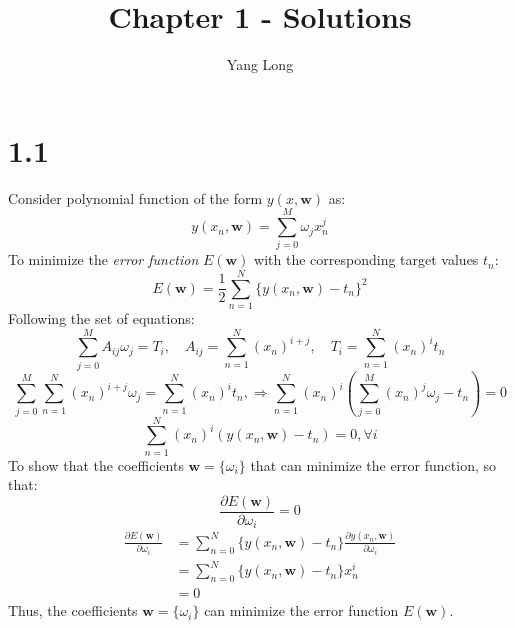 \documentclass[10pt,a4paper,draft]{book}
\author{Yang Long}
\title{Chapter 1 - Solutions}
\begin{document}
\maketitle
\section*{1.1}
Consider polynomial function of the form $y(x,\bm{w})$ as:
\begin{equation}
y(x_n,\bm{w}) = \sum_{j=0}^M \omega_j x_n^j
\end{equation}
To minimize the \emph{error function} $E(\bm{w})$  with the corresponding target values $t_n$:
\begin{equation}
E(\bm{w}) = \frac{1}{2}\sum_{n=1}^N \{y(x_n,\bm{w})-t_n\}^2
\end{equation}
Following the set of equations:
\begin{equation}
\sum_{j=0}^M A_{ij}\omega_j  = T_i, \quad
A_{ij} = \sum_{n=1}^{N} (x_n)^{i+j}, \quad T_i = \sum_{n=1}^{N} (x_n)^i t_n
\end{equation}
\begin{equation}
\sum_{j=0}^M \sum_{n=1}^{N} (x_n)^{i+j}\omega_j  = \sum_{n=1}^{N} (x_n)^i t_n, \Rightarrow \sum_{n=1}^{N} (x_n)^i\left(\sum_{j=0}^M (x_n)^{j}\omega_j - t_n\right) = 0
\end{equation}
\begin{equation}
\sum_{n=1}^{N} (x_n)^i\left(y(x_n,\bm{w}) - t_n\right) = 0, \forall i 
\end{equation} 
To show that the coefficients $\bm{w} = \{\omega_i\}$ that can minimize the error function, so that:
\begin{equation}
\frac{\partial E(\bm{w})}{\partial \omega_i} = 0
\end{equation}
\begin{equation}
\begin{aligned}
\frac{\partial E(\bm{w})}{\partial \omega_i} &=\sum_{n=0}^N \{y(x_n,\bm{w})-t_n\} \frac{\partial y(x_n,\bm{w})}{\partial \omega_i} \\
&=\sum_{n=0}^N \{y(x_n,\bm{w})-t_n\} x_n^i \\
&=0
\end{aligned}
\end{equation}
Thus, the coefficients $\bm{w} = \{\omega_i\}$ can minimize the error function $E(\bm{w})$.
\end{document}
